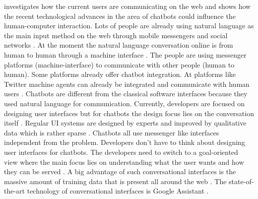 \citet{folstad2017chatbots} investigates how the current users are communicating on the web and shows how 
the recent technological advances in the area of chatbots could influence the human-computer interaction.
Lots of people are already using natural language as the main input method on the web through mobile messengers 
and social networks \cite{folstad2017chatbots}. 
At the moment the natural language conversation online is from human to human through a machine interface \cite{folstad2017chatbots}.
The people are using messenger platforms (machine-interface) to communicate with other people (human to human).
Some platforms already offer chatbot integration. 
At platforms like Twitter machine agents can already be integrated and communicate with human users \cite{folstad2017chatbots}. 
Chatbots are different from the classical software interfaces because they used natural language 
for communication.
Currently, developers are focused on designing user interfaces but for chatbots the design focus 
lies on the conversation itself \cite{folstad2017chatbots}. 
Regular UI systems are designed by experts and improved by qualitative data which is rather sparse \cite{folstad2017chatbots}.
Chatbots all use messenger like interfaces independent from the problem.
Developers don't have to think about designing user interfaces for chatbots.
The developers need to switch to a goal-oriented view where the main focus 
lies on understanding what the user wants and how they can be served \cite{folstad2017chatbots}.
A big advantage of such conversational interfaces is the massive amount of training data that is present all around the web \cite{folstad2017chatbots}. 
The state-of-the-art technology of conversational interfaces is Google Assistant \cite{folstad2017chatbots}.

